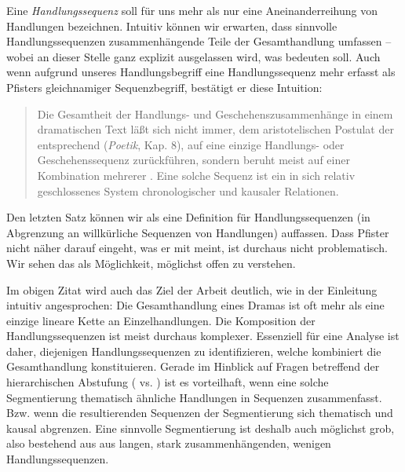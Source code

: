 \documentclass[a4paper,10pt,abstract=true,headings=small]{scrartcl}
\begin{document}
Eine \emph{Handlungssequenz} soll für uns mehr als nur eine Aneinanderreihung von Handlungen bezeichnen.
Intuitiv können wir erwarten, dass sinnvolle Handlungssequenzen zusammenhängende Teile der Gesamthandlung umfassen – wobei an dieser Stelle ganz explizit ausgelassen wird, was  bedeuten soll.
Auch wenn aufgrund unseres Handlungsbegriff eine Handlungssequenz mehr erfasst als Pfisters gleichnamiger Sequenzbegriff, bestätigt er diese Intuition: %
\blockcquote[Vgl.][285]{pfister_drama:_2001}{
    Die Gesamtheit der Handlungs- und Geschehenszusammenhänge  in 
    einem dramatischen Text läßt sich nicht immer, dem aristotelischen Postulat der  entsprechend (\emph{Poetik}, Kap. 8), auf eine einzige Handlungs- oder Geschehenssequenz  zurückführen, sondern beruht meist auf einer Kombination mehrerer . Eine solche Sequenz ist ein in sich relativ geschlossenes System 
chronologischer und kausaler Relationen.
}
Den letzten Satz können wir als eine Definition für Handlungssequenzen (in Abgrenzung an willkürliche Sequenzen von Handlungen) auffassen.
Dass Pfister nicht näher darauf eingeht, was er mit  meint, ist durchaus nicht problematisch.
Wir sehen das als Möglichkeit,  möglichst offen zu verstehen.

\label{page:plot-segmentierung}
Im obigen Zitat wird auch das Ziel der Arbeit deutlich, wie in der Einleitung intuitiv angesprochen:
Die Gesamthandlung eines Dramas ist oft mehr als eine einzige lineare Kette an Einzelhandlungen.
Die Komposition der Handlungssequenzen ist meist durchaus komplexer.
Essenziell für eine Analyse ist daher, diejenigen Handlungssequenzen zu identifizieren, welche kombiniert die Gesamthandlung konstituieren.
Gerade im Hinblick auf Fragen betreffend der hierarchischen Abstufung ( vs. ) ist es vorteilhaft, wenn eine solche Segmentierung thematisch ähnliche Handlungen in Sequenzen zusammenfasst.
Bzw. wenn die resultierenden Sequenzen der Segmentierung sich thematisch und kausal abgrenzen.
Eine sinnvolle Segmentierung ist deshalb auch möglichst grob, also bestehend aus aus langen, stark zusammenhängenden, wenigen Handlungssequenzen.
\end{document}
